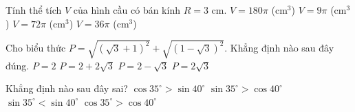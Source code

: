 \begin{ex}%
	 Tính thể tích $V$ của hình cầu có bán kính $R=3$ cm.
	\choice
	{$V=180 \pi$ (cm$^3$)}
	{$V=9 \pi$ (cm$^3$)}
	{$V=72 \pi$ (cm$^3$)}
	{\True $V=36 \pi$ (cm$^3$)}
\end{ex}

\begin{ex}%
	Cho biểu thức $P=\sqrt{(\sqrt{3}+1)^2}+\sqrt{(1- \sqrt{3})^2}$. Khẳng định nào sau đây đúng.
	\choice
	{$P=2$}
	{$P=2+2\sqrt{3}$}
	{$P=2-\sqrt{3}$}
	{\True $P=2\sqrt{3}$}
\end{ex}
\begin{ex}%
	 Khẳng định nào sau đây sai?
	\choice
	{$\cos 35^\circ>\sin 40^\circ$}
	{\True $\sin 35^\circ > \cos 40^\circ$}
	{$\sin 35^\circ < \sin 40^\circ$}
	{$\cos 35^\circ > \cos 40^\circ$}
\end{ex}

